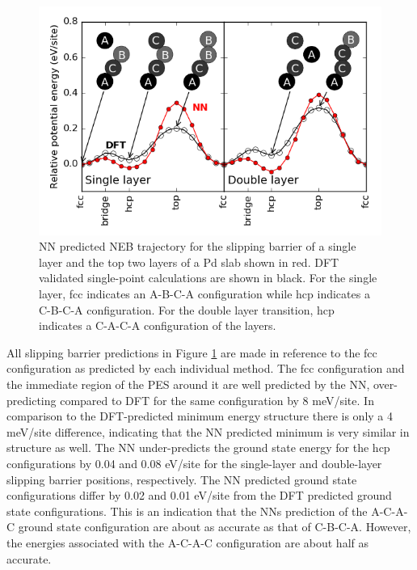 \documentclass[12pt]{cmuthesis}
\begin{document}
\begin{figure}[htbp]
\centering
\includegraphics[width=5in]{./images/Pd-slipping-NEB.png}
\caption{\label{fig-Pd-slipping-NEB}
NN predicted NEB trajectory for the slipping barrier of a single layer and the top two layers of a Pd slab shown in red. DFT validated single-point calculations are shown in black. For the single layer, fcc indicates an A-B-C-A configuration while hcp indicates a C-B-C-A configuration. For the double layer transition, hcp indicates a C-A-C-A configuration of the layers.}
\end{figure}

All slipping barrier predictions in Figure \ref{fig-Pd-slipping-NEB} are made in reference to the fcc configuration as predicted by each individual method. The fcc configuration and the immediate region of the PES around it are well predicted by the NN, over-predicting compared to DFT for the same configuration by 8 meV/site. In comparison to the DFT-predicted minimum energy structure there is only a 4 meV/site difference, indicating that the NN predicted minimum is very similar in structure as well. The NN under-predicts the ground state energy for the hcp configurations by 0.04 and 0.08 eV/site for the single-layer and double-layer slipping barrier positions, respectively. The NN predicted ground state configurations differ by 0.02 and 0.01 eV/site from the DFT predicted ground state configurations. This is an indication that the NNs prediction of the A-C-A-C ground state configuration are about as accurate as that of C-B-C-A. However, the energies associated with the A-C-A-C configuration are about half as accurate.
\end{document}
